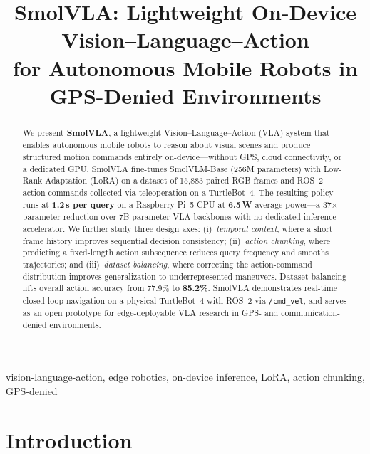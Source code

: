 \documentclass[conference]{IEEEtran}
\begin{document}
\title{SmolVLA: Lightweight On-Device Vision--Language--Action\\
for Autonomous Mobile Robots in GPS-Denied Environments}

\author{
}

\maketitle

\begin{abstract}
We present \textbf{SmolVLA}, a lightweight Vision--Language--Action (VLA) system that enables
autonomous mobile robots to reason about visual scenes and produce structured motion commands
entirely on-device---without GPS, cloud connectivity, or a dedicated GPU. SmolVLA fine-tunes
SmolVLM-Base (256M parameters) with Low-Rank Adaptation (LoRA) on a dataset of 15,883 paired
RGB frames and ROS~2 action commands collected via teleoperation on a TurtleBot~4. The resulting
policy runs at \textbf{1.2\,s per query} on a Raspberry Pi~5 CPU at \textbf{6.5\,W} average
power---a 37$\times$ parameter reduction over 7B-parameter VLA backbones with no dedicated
inference accelerator. We further study three design axes: (i)~\emph{temporal context}, where a
short frame history improves sequential decision consistency; (ii)~\emph{action chunking}, where
predicting a fixed-length action subsequence reduces query frequency and smooths trajectories;
and (iii)~\emph{dataset balancing}, where correcting the action-command distribution improves
generalization to underrepresented maneuvers. Dataset balancing lifts overall action accuracy
from 77.9\% to \textbf{85.2\%}. SmolVLA demonstrates real-time closed-loop navigation on a
physical TurtleBot~4 with ROS~2 via \texttt{/cmd\_vel}, and serves as an open prototype for
edge-deployable VLA research in GPS- and communication-denied environments.
\end{abstract}

\begin{IEEEkeywords}
vision-language-action, edge robotics, on-device inference, LoRA, action chunking, GPS-denied
\end{IEEEkeywords}

\section{Introduction}
\label{sec:intro}
\end{document}
